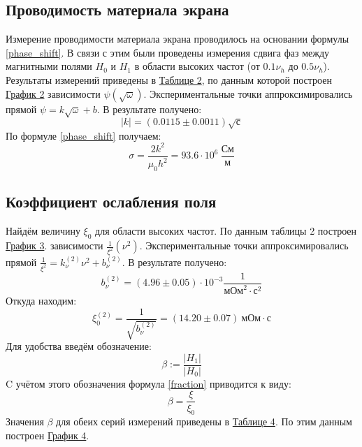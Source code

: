 \documentclass[15pt,a5paper,reqno]{article}
\begin{document}
    \subsection{Проводимость материала экрана}

    Измерение проводимости материала экрана проводилось на основании формулы \eqref{phase_shift}. В связи с этим были проведены измерения сдвига фаз между магнитными полями $H_0$ и $H_1$ в области высоких частот (от $0.1\nu_h$ до $0.5\nu_h$). Результаты измерений приведены в \hyperlink{table_2}{Таблице 2}, по данным которой построен \hyperlink{graph_2}{График 2} зависимости $\psi(\sqrt{\omega})$. Экспериментальные точки аппроксимировались прямой $\psi = k\sqrt{\omega} + b$. В результате получено:
    \begin{equation*}
        |k| = (0.0115 \pm 0.0011)\sqrt{\text{с}}
    \end{equation*}
    По формуле \eqref{phase_shift} получаем:
    \begin{equation*}
        \sigma = \frac{2k^2}{\mu_0h^2} = 93.6\cdot10^6\ \frac{\text{См}}{\text{м}}
    \end{equation*}

    \subsection{Коэффициент ослабления поля}
    
    Найдём величину $\xi_0$ для области высоких частот. По данным таблицы 2 построен \hyperlink{graph_3}{График 3}. зависимости $\frac{1}{\xi^2}(\nu^2)$. Экспериментальные точки аппроксимировались прямой $\frac{1}{\xi^2} =k_{\nu}^{(2)}\nu^2 + b_{\nu}^{(2)}$. В результате получено:
     \begin{equation*}
        b_{\nu}^{(2)} = (4.96 \pm 0.05)\cdot10^{-3}\frac{1}{\text{мОм}^2\cdot\text{с}^2}
    \end{equation*}
    Откуда находим:
    \begin{equation*}
        \xi_0^{(2)} = \frac{1}{\sqrt{b_{\nu}^{(2)}}} = (14.20 \pm 0.07)\ \text{мОм}\cdot\text{с}
    \end{equation*}
    Для удобства введём обозначение:
    \begin{equation*}
        \beta := \frac{|H_1|}{|H_0|}
    \end{equation*}
    C учётом этого обозначения формула \eqref{fraction} приводится к виду:
    \begin{equation*}\label{weak_coeff}
        \beta = \frac{\xi}{\xi_0}
    \end{equation*}
    Значения $\beta$ для обеих серий измерений приведены в \hyperlink{table_4}{Таблице 4}. По этим данным построен \hyperlink{graph_4}{График 4}.
    
\end{document}
